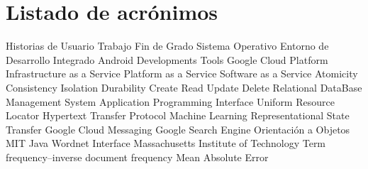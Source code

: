 \chapter{Listado de acrónimos}

{\small
\begin{acronym}[XXXXXXXX]
  		 {Historias de Usuario}	
   	 {Trabajo Fin de Grado}
  		 {Sistema Operativo}
   	 {Entorno de Desarrollo Integrado}
   	 {Android Developments Tools}
   	 {Google Cloud Platform}
      {Infrastructure as a Service}
      {Platform as a Service}
  	 {Software as a Service}
   	 {Atomicity Consistency Isolation Durability}
  	 {Create Read Update Delete}
  	 {Relational DataBase Management System}
       {Application Programming Interface}
   	 {Uniform Resource Locator}
   	 {Hypertext Transfer Protocol}
  		 {Machine Learning}
  	 {Representational State Transfer}
  	 {Google Cloud Messaging}
       {Google Search Engine}
  		 {Orientación a Objetos}
   	 {MIT Java Wordnet Interface}
  	 {Massachusetts Institute of Technology}
  	 {Term frequency–inverse document frequency}
  	 {Mean Absolute Error} 
\end{acronym}
}





